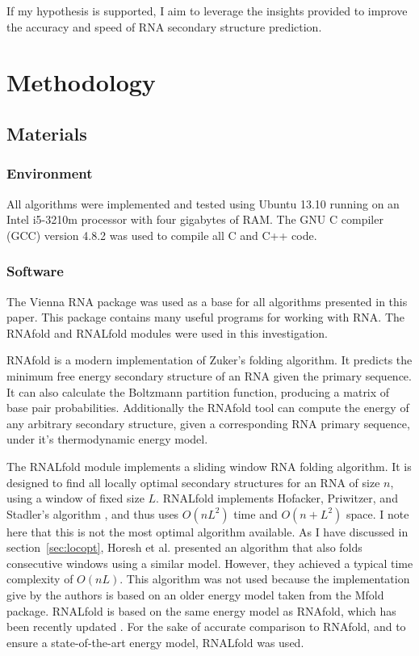 \documentclass{cshonours}
\begin{document}
If my hypothesis is supported, I aim to leverage the insights provided to improve the accuracy and speed of RNA secondary structure prediction.

\chapter{Methodology}

\section{Materials}
\subsection{Environment}
All algorithms were implemented and tested using Ubuntu 13.10 running on an Intel i5-3210m processor with four gigabytes of RAM. The GNU C compiler (GCC) version 4.8.2 was used to compile all C and C++ code. 

\subsection{Software}
The Vienna RNA package \cite{lorenz2011viennarna} was used as a base for all algorithms presented in this paper. This package contains many useful programs for working with RNA. The RNAfold and RNALfold modules were used in this investigation. 

RNAfold is a modern implementation of Zuker's folding algorithm. It predicts the minimum free energy secondary structure of an RNA given the primary sequence. It can also calculate the Boltzmann partition function, producing a matrix of base pair probabilities. Additionally the RNAfold tool can compute the energy of any arbitrary secondary structure, given a corresponding RNA primary sequence, under it's thermodynamic energy model.

The RNALfold module implements a sliding window RNA folding algorithm. It is designed to find all locally optimal secondary structures for an RNA of size $n$, using a window of fixed size $L$. RNALfold implements Hofacker, Priwitzer, and Stadler's algorithm \cite{hofacker2004prediction}, and thus uses $O(nL^2)$ time and $O(n + L^2)$ space. I note here that this is not the most optimal algorithm available. As I have discussed in section~\ref{sec:locopt}, Horesh et al. \cite{horesh2009rnaslider} presented an algorithm that also folds consecutive windows using a similar model. However, they achieved a typical time complexity of $O(nL)$. This algorithm was not used because the implementation give by the authors is based on an older energy model taken from the Mfold package. RNALfold is based on the same energy model as RNAfold, which has been recently updated \cite{lorenz2011viennarna}. For the sake of accurate comparison to RNAfold, and to ensure a state-of-the-art energy model, RNALfold was used.
\end{document}

